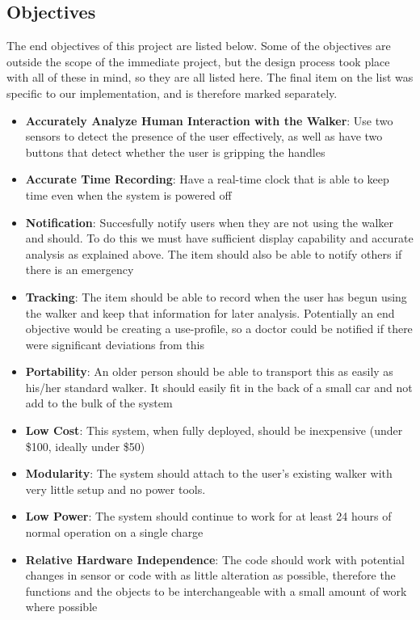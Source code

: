 \documentclass{article}
\begin{document}
\subsection{Objectives}
The end objectives of this project are listed below. Some of the objectives are outside the scope of the immediate project, but the design process took place with all of these in mind, so they are all listed here. The final item on the list was specific to our implementation, and is therefore marked separately. 
\begin{itemize}
	\item \textbf{Accurately Analyze Human Interaction with the Walker}: Use two sensors to detect the presence of the user effectively, as well as have two buttons that detect whether the user is gripping the handles
	\item \textbf{Accurate Time Recording}: Have a real-time clock that is able to keep time even when the system is powered off
	\item \textbf{Notification}: Succesfully notify users when they are not using the walker and should. To do this we must have sufficient display capability and accurate analysis as explained above. The item should also be able to notify others if there is an emergency
	\item \textbf{Tracking}: The item should be able to record when the user has begun using the walker and keep that information for later analysis. Potentially an end objective would be creating a use-profile, so a doctor could be notified if there were significant deviations from this 
	\item \textbf{Portability}: An older person should be able to transport this as easily as his/her standard walker. It should easily fit in the back of a small car and not add to the bulk of the system
	\item \textbf{Low Cost}: This system, when fully deployed, should be inexpensive (under \$100, ideally under \$50)
	\item \textbf{Modularity}: The system should attach to the user's existing walker with very little setup and no power tools. 
	\item \textbf{Low Power}: The system should continue to work for at least 24 hours of normal operation on a single charge
	\item[\textasteriskcentered] \textbf{Relative Hardware Independence}: The code should work with potential changes in sensor or code with as little alteration as possible, therefore the functions and the objects to be interchangeable with a small amount of work where possible
\end{itemize}
\end{document}
